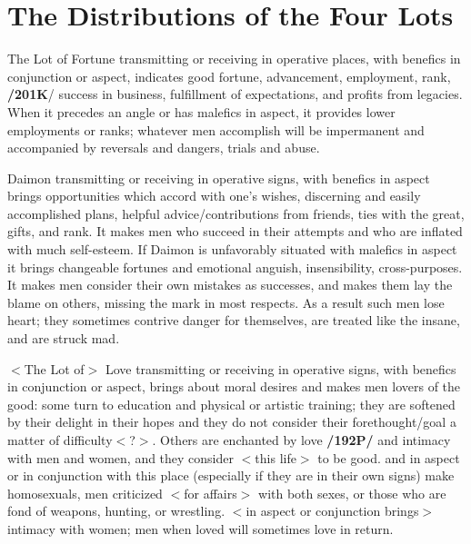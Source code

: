 \section{The Distributions of the Four Lots}

The Lot of Fortune transmitting or receiving in operative places, with benefics in conjunction or aspect, indicates good fortune, advancement, employment, rank, \textbf{/201K}/ success in business, fulfillment of expectations, and profits from legacies. When it precedes an angle or has malefics in aspect, it provides lower employments or ranks; whatever men accomplish will be impermanent and accompanied by reversals and dangers, trials and abuse.

Daimon  transmitting or receiving in operative signs, with benefics in aspect brings opportunities which accord with one’s wishes, discerning and easily accomplished plans, helpful advice/contributions from friends, ties with the great, gifts, and rank. It makes men who succeed in their attempts and who are inflated with much self-esteem. If Daimon is unfavorably situated with malefics in aspect it brings
changeable fortunes and emotional anguish, insensibility, cross-purposes. It makes men consider their own mistakes as successes, and makes them lay the blame on others, missing the mark in most respects. As a result such men lose heart; they sometimes contrive danger for themselves, are treated like the insane, and are struck mad.

$<$The Lot of$>$ Love  transmitting or receiving in operative signs, with benefics in conjunction or aspect, brings about moral desires and makes men lovers of the good: some turn to education and physical or artistic training; they are softened by their delight in their hopes and they do not consider their forethought/goal a matter of difficulty$<$?$>$. Others are enchanted by love \textbf{/192P/} and intimacy with men and women, and they consider $<$this life$>$ to be good. \Mars\xspace and \Mercury\xspace in aspect or in conjunction with this place (especially if they are in their own signs) make homosexuals, men criticized $<$for affairs$>$ with both sexes, or those who are fond of weapons, hunting, or wrestling. \Venus\xspace $<$in aspect or conjunction brings$>$ intimacy with women; men when loved will sometimes love in return.

